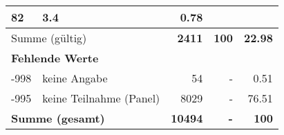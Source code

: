 \begin{longtable}{lXrrr}
       \num{82} &
       \num[round-mode=places,round-precision=2]{3,4} &
         \num[round-mode=places,round-precision=2]{0,78} \\
     \midrule
     \multicolumn{2}{l}{Summe (gültig)} &
       \textbf{\num{2411}} &
     \textbf{100} &
       \textbf{\num[round-mode=places,round-precision=2]{22,98}} \\
     \multicolumn{5}{l}{\textbf{Fehlende Werte}}\\
       -998 &
       keine Angabe &
         \num{54} &
        - &
         \num[round-mode=places,round-precision=2]{0,51} \\
       -995 &
       keine Teilnahme (Panel) &
         \num{8029} &
        - &
         \num[round-mode=places,round-precision=2]{76,51} \\
     \midrule
     \multicolumn{2}{l}{\textbf{Summe (gesamt)}} &
          \textbf{\num{10494}} &
        \textbf{-} &
        \textbf{100} \\
     \bottomrule
     \end{longtable}
     
